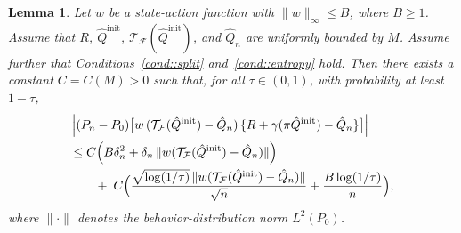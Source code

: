 \documentclass{article}
\theoremstyle{plain}
\newtheorem{lemma}{Lemma}
\theoremstyle{definition}
\theoremstyle{remark}
\begin{document}
\begin{lemma}
\label{lemma::empiricalprocess}
Let \(w\) be a state-action function with \(\|w\|_\infty\le B\), where
\(B\ge1\). Assume that \(R\), \(\hat{Q}^{\mathrm{init}}\),
\(\mathcal{T}_{\mathcal{F}}(\hat{Q}^{\mathrm{init}})\), and \(\hat{Q}_n\)
are uniformly bounded by \(M\). Assume further that Conditions~\ref{cond::split}
and~\ref{cond::entropy} hold. Then there exists a constant \(C=C(M)>0\) such that, for all
$\tau \in (0,1)$, with probability at least $1 - \tau$,
\begin{align*}
&\left|(P_n - P_0)\big[
   w\,
   (\mathcal{T}_{\mathcal{F}}(\hat{Q}^{\mathrm{init}}) - \hat{Q}_n)\,
   \{R + \gamma(\pi \hat{Q}^{\mathrm{init}}) - \hat{Q}_n\}
 \big]\right|
\\
& \le
C\Bigl(
    B\delta_n^2
    + \delta_n\,\|w(\mathcal{T}_{\mathcal{F}}(\hat{Q}^{\mathrm{init}}) - \hat{Q}_n)\|
\Bigr)
\\
&\qquad+\;
C\Bigl(
    \frac{\sqrt{\log(1/\tau)}\,\|w(\mathcal{T}_{\mathcal{F}}(\hat{Q}^{\mathrm{init}}) - \hat{Q}_n)\|}{\sqrt{n}}
    + \frac{B\log(1/\tau)}{n}
\Bigr),
\end{align*}
where $\|\cdot\|$ denotes the behavior-distribution norm \(L^2(P_0)\).
\end{lemma}
\end{document}
